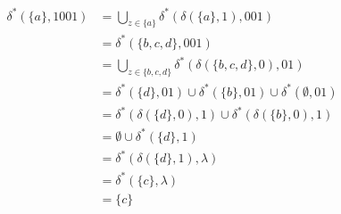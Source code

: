 
\begin{align*}
	\delta^*(\{a\},1001)&=\bigcup_{z\in\{a\}}\delta^*(\delta(\{a\},1),001)\\
	&=\delta^*(\{b,c,d\},001)\\
	&=\bigcup_{z\in\{b,c,d\}}\delta^*(\delta(\{b,c,d\},0),01)\\
	&=\delta^*(\{d\},01)\cup\delta^*(\{b\},01)\cup\delta^*(\emptyset,01)\\
	&=\delta^*(\delta(\{d\},0),1)\cup\delta^*(\delta(\{b\},0),1)\\
	&=\emptyset\cup\delta^*(\{d\},1)\\
	&=\delta^*(\delta(\{d\},1),\lambda)\\
	&=\delta^*(\{c\},\lambda)\\
	&=\{c\}
\end{align*}
